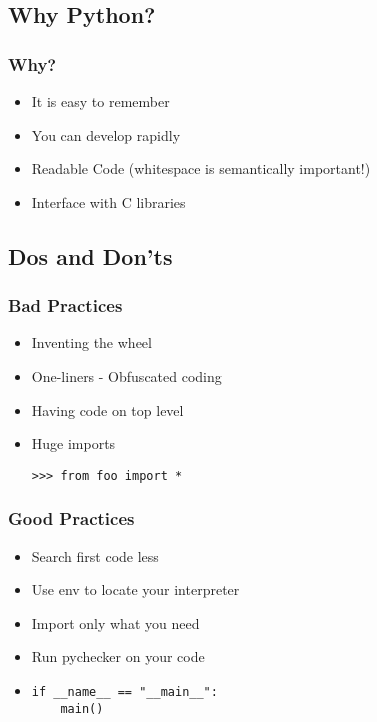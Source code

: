 \documentclass{beamer}
\begin{document}
\subsection{Why Python?}
\begin{frame}
    \frametitle{Why?}
    \begin{itemize}
        \item<1-> It is easy to remember
        \item<2-> You can develop rapidly
        \item<3-> Readable Code (whitespace is semantically important!)
        \item<4-> Interface with C libraries
    \end{itemize}
\end{frame}
\subsection{Dos and Don'ts}

\begin{frame}[fragile]
    \frametitle{Bad Practices}

    \begin{itemize}
        \item<1-> Inventing the wheel
        \item<2-> One-liners - Obfuscated coding
        \item<3-> Having code on top level
        \item<4-> Huge imports
            \begin{verbatim}
>>> from foo import *
            \end{verbatim}
    \end{itemize}

\end{frame}

\begin{frame}[fragile]
    \frametitle{Good Practices}

    \begin{itemize}
        \item<1-> Search first code less
        \item<2-> Use env to locate your interpreter
        \item<3-> Import only what you need
        \item<4-> Run pychecker on your code
        \item<5-> 
            \begin{verbatim} 
if __name__ == "__main__":
    main()
            \end{verbatim}
    \end{itemize}

\end{frame}
\end{document}
